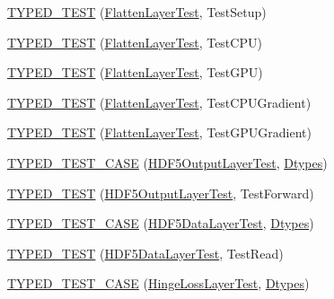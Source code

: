 \begin{DoxyCompactItemize}
\item 
\hyperlink{namespacecaffe_ad404000072a0cae2ea4db0a6439cf9b0}{T\+Y\+P\+E\+D\+\_\+\+T\+E\+S\+T} (\hyperlink{classcaffe_1_1_flatten_layer_test}{Flatten\+Layer\+Test}, Test\+Setup)
\item 
\hyperlink{namespacecaffe_ab42a81dc45ab7dd95a830e68fa575cbe}{T\+Y\+P\+E\+D\+\_\+\+T\+E\+S\+T} (\hyperlink{classcaffe_1_1_flatten_layer_test}{Flatten\+Layer\+Test}, Test\+C\+P\+U)
\item 
\hyperlink{namespacecaffe_a543ea8ebf5c6eb12b2f6979892d96b58}{T\+Y\+P\+E\+D\+\_\+\+T\+E\+S\+T} (\hyperlink{classcaffe_1_1_flatten_layer_test}{Flatten\+Layer\+Test}, Test\+G\+P\+U)
\item 
\hyperlink{namespacecaffe_a5285bfa7e0e8c111412d66586a310f29}{T\+Y\+P\+E\+D\+\_\+\+T\+E\+S\+T} (\hyperlink{classcaffe_1_1_flatten_layer_test}{Flatten\+Layer\+Test}, Test\+C\+P\+U\+Gradient)
\item 
\hyperlink{namespacecaffe_a724634c178a5bd0bb7a840277bcc115d}{T\+Y\+P\+E\+D\+\_\+\+T\+E\+S\+T} (\hyperlink{classcaffe_1_1_flatten_layer_test}{Flatten\+Layer\+Test}, Test\+G\+P\+U\+Gradient)
\item 
\hyperlink{namespacecaffe_a35c8a2fadb504379d9743071522193b1}{T\+Y\+P\+E\+D\+\_\+\+T\+E\+S\+T\+\_\+\+C\+A\+S\+E} (\hyperlink{classcaffe_1_1_h_d_f5_output_layer_test}{H\+D\+F5\+Output\+Layer\+Test}, \hyperlink{namespacecaffe_a131dc2be50f2f10e18450da61cde6b57}{Dtypes})
\item 
\hyperlink{namespacecaffe_a3588d1e57eb7fe5254c708d1f131fc6e}{T\+Y\+P\+E\+D\+\_\+\+T\+E\+S\+T} (\hyperlink{classcaffe_1_1_h_d_f5_output_layer_test}{H\+D\+F5\+Output\+Layer\+Test}, Test\+Forward)
\item 
\hyperlink{namespacecaffe_a5e22da654fac208c97a228cb1cbf33a6}{T\+Y\+P\+E\+D\+\_\+\+T\+E\+S\+T\+\_\+\+C\+A\+S\+E} (\hyperlink{classcaffe_1_1_h_d_f5_data_layer_test}{H\+D\+F5\+Data\+Layer\+Test}, \hyperlink{namespacecaffe_a131dc2be50f2f10e18450da61cde6b57}{Dtypes})
\item 
\hyperlink{namespacecaffe_a95eec0c4ad3759d52c809ccecbe3a223}{T\+Y\+P\+E\+D\+\_\+\+T\+E\+S\+T} (\hyperlink{classcaffe_1_1_h_d_f5_data_layer_test}{H\+D\+F5\+Data\+Layer\+Test}, Test\+Read)
\item 
\hyperlink{namespacecaffe_af342bc9515fd984f45cfb233417659f3}{T\+Y\+P\+E\+D\+\_\+\+T\+E\+S\+T\+\_\+\+C\+A\+S\+E} (\hyperlink{classcaffe_1_1_hinge_loss_layer_test}{Hinge\+Loss\+Layer\+Test}, \hyperlink{namespacecaffe_a131dc2be50f2f10e18450da61cde6b57}{Dtypes})
\item 

\end{DoxyCompactItemize}
